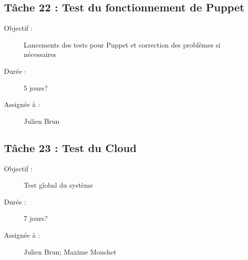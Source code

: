 \subsection*{Tâche 22 : Test du fonctionnement de Puppet}
\begin{description}
\item[Objectif :] Lancements des tests pour Puppet et correction des problèmes si nécessaires
\item[Durée :] 5 jours?
\item[Assignée à :] Julien Brun
\end{description}

\subsection*{Tâche 23 : Test du Cloud}
\begin{description}
\item[Objectif :] Test global du système
\item[Durée :] 7 jours?
\item[Assignée à :] Julien Brun; Maxime Mouchet
\end{description}